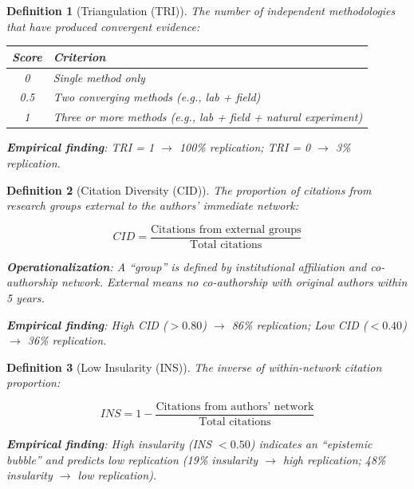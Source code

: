 \documentclass[11pt,a4paper]{article}
\newtheorem{definition}{Definition}[section]
\begin{document}
\begin{definition}[Triangulation (TRI)]
\label{def:tri}
The number of independent methodologies that have produced convergent evidence:

\begin{center}
\begin{tabular}{cl}
\toprule
\textbf{Score} & \textbf{Criterion} \\
\midrule
0 & Single method only \\
0.5 & Two converging methods (e.g., lab + field) \\
1 & Three or more methods (e.g., lab + field + natural experiment) \\
\bottomrule
\end{tabular}
\end{center}

\textbf{Empirical finding}: TRI = 1 $\rightarrow$ 100\% replication; TRI = 0 $\rightarrow$ 3\% replication.
\end{definition}

\begin{definition}[Citation Diversity (CID)]
\label{def:cid}
The proportion of citations from research groups external to the authors' immediate network:

\begin{equation}
CID = \frac{\text{Citations from external groups}}{\text{Total citations}}
\end{equation}

\textbf{Operationalization}: A ``group'' is defined by institutional affiliation and co-authorship network. External means no co-authorship with original authors within 5 years.

\textbf{Empirical finding}: High CID ($> 0.80$) $\rightarrow$ 86\% replication; Low CID ($< 0.40$) $\rightarrow$ 36\% replication.
\end{definition}

\begin{definition}[Low Insularity (INS)]
\label{def:ins}
The inverse of within-network citation proportion:

\begin{equation}
INS = 1 - \frac{\text{Citations from authors' network}}{\text{Total citations}}
\end{equation}

\textbf{Empirical finding}: High insularity (INS $< 0.50$) indicates an ``epistemic bubble'' and predicts low replication (19\% insularity $\rightarrow$ high replication; 48\% insularity $\rightarrow$ low replication).
\end{definition}
\end{document}
